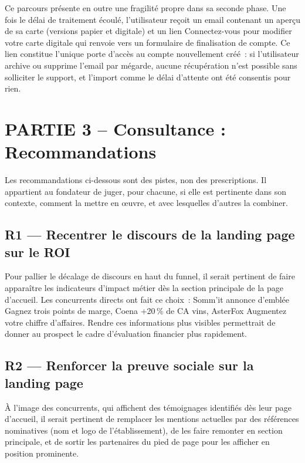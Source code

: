 \documentclass[12pt, a4paper]{article}
\begin{document}
Ce parcours présente en outre une fragilité propre dans sa seconde phase. Une fois le
délai de traitement écoulé, l'utilisateur reçoit un email contenant un aperçu de sa carte
(versions papier et digitale) et un lien \og{}Connectez-vous pour modifier votre carte
digitale\fg{} qui renvoie vers un formulaire de finalisation de compte. Ce lien constitue
l'unique porte d'accès au compte nouvellement créé~: si l'utilisateur archive ou supprime
l'email par mégarde, aucune récupération n'est possible sans solliciter le support, et
l'import comme le délai d'attente ont été consentis pour rien.

\section*{PARTIE 3 – Consultance : Recommandations}

Les recommandations ci-dessous sont des pistes, non des prescriptions. Il appartient au
fondateur de juger, pour chacune, si elle est pertinente dans son contexte, comment la mettre
en œuvre, et avec lesquelles d'autres la combiner.

\subsection{R1 — Recentrer le discours de la landing page sur le ROI}

Pour pallier le décalage de discours en haut du funnel, il serait pertinent de faire
apparaître les indicateurs d'impact métier dès la section principale de la page d'accueil.
Les concurrents directs ont fait ce choix~: Somm'it annonce d'emblée \og{}Gagnez trois points de
marge\fg{}, Coena \og{}+20\,\% de CA vins\fg{}, AsterFox \og{}Augmentez votre chiffre
d'affaires\fg{}. Rendre ces informations plus visibles 
permettrait de donner au prospect le cadre d'évaluation financier plus rapidement.

\subsection{R2 — Renforcer la preuve sociale sur la landing page}

À l'image des concurrents, qui affichent des témoignages identifiés dès leur page
d'accueil, il serait pertinent de remplacer les mentions actuelles par des références
nominatives (nom et logo de l'établissement), de les faire remonter
en section principale, et de sortir les partenaires du pied de page pour les afficher en
position prominente.
\end{document}

